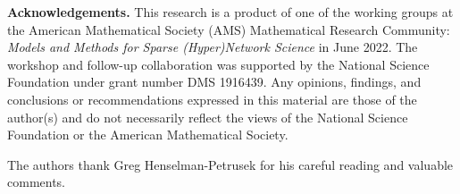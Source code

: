 \documentclass[reqno,oneside,11pt]{amsart}
\theoremstyle{definition}
\theoremstyle{remark}
\begin{document}
%

\noindent \textbf{Acknowledgements.} This research is a product of one of the working groups at the American Mathematical Society (AMS) Mathematical Research Community: \textit{Models and Methods for Sparse (Hyper)Network Science} in June 2022. The workshop and follow-up collaboration was supported by the National Science Foundation under grant number DMS 1916439. Any opinions, findings, and conclusions or recommendations expressed in this
material are those of the author(s) and do not necessarily reflect the views of the National Science Foundation or the American Mathematical Society.

The authors thank Greg Henselman-Petrusek for his careful reading and valuable comments.



%
\end{document}

